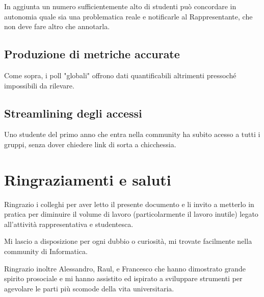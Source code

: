 \documentclass{article}
\begin{document}
In aggiunta un numero sufficientemente alto di studenti può concordare in autonomia quale sia una problematica reale e notificarle al Rappresentante, che non deve fare altro che annotarla.

\subsection{Produzione di metriche accurate}
Come sopra, i poll "globali" offrono dati quantificabili altrimenti pressoché impossibili da rilevare.


\subsection{Streamlining degli accessi}
Uno studente del primo anno che entra nella community ha subito acesso a tutti i gruppi, senza dover chiedere link di sorta a chicchessia.

\section{Ringraziamenti e saluti}
Ringrazio i colleghi per aver letto il presente documento e li invito a metterlo in pratica per diminuire il volume di lavoro (particolarmente il lavoro inutile) legato all'attività rappresentativa e studentesca.

Mi lascio a disposizione per ogni dubbio o curiosità, mi trovate facilmente nella community di Informatica.

Ringrazio inoltre Alessandro, Raul, e Francesco che hanno dimostrato grande spirito prosociale e mi hanno assistito ed ispirato a sviluppare strumenti per agevolare le parti più scomode della vita universitaria.
\end{document}
